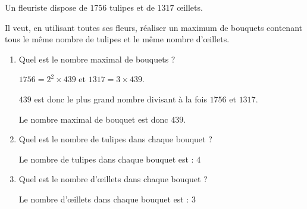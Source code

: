     Un fleuriste dispose de $\num{1756}$ tulipes et de $\num{1317}$ \oe illets.

    Il veut, en utilisant toutes ses fleurs, réaliser un maximum de bouquets contenant tous le même nombre de tulipes et le même nombre d'\oe illets.

    \begin{enumerate}
        \item Quel est le nombre maximal de bouquets ?

        {\color{red} $\num{1756} = 2^2\times 439$ et $\num{1317} = 3\times 439$.

            $439$ est donc le plus grand nombre divisant à la fois $\num{1756}$ et $\num{1317}$.

            Le nombre maximal de bouquet est donc $439$.
        }
        \item Quel est le nombre de tulipes dans chaque bouquet ?

        {\color{red} Le nombre de tulipes dans chaque bouquet est : $4$}
        \item Quel est le nombre d'\oe illets dans chaque bouquet ?

        {\color{red} Le nombre d'\oe illets dans chaque bouquet est : $3$}
    \end{enumerate}
